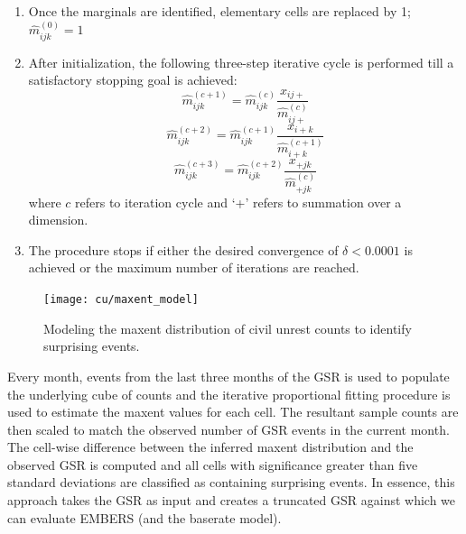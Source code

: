 \begin{enumerate}
\item Once the marginals are identified, elementary cells are replaced by 1; $\widehat{m}^{(0)}_{ijk}=1$
\item After initialization, the following three-step iterative cycle is performed till a satisfactory stopping goal is achieved:
$$\widehat{m}^{(c+1)}_{ijk} = \widehat{m}^{(c)}_{ijk}\frac{x_{ij+}}{\widehat{m}^{(c)}_{ij+}}$$
$$\widehat{m}^{(c+2)}_{ijk} = \widehat{m}^{(c+1)}_{ijk}\frac{x_{i+k}}{\widehat{m}^{(c+1)}_{i+k}}$$
$$\widehat{m}^{(c+3)}_{ijk} = \widehat{m}^{(c+2)}_{ijk}\frac{x_{+jk}}{\widehat{m}^{(c)}_{+jk}}$$
where $c$ refers to iteration cycle and `+' refers to summation over a dimension.
\item The procedure stops if either the desired convergence of $\delta < 0.0001$ is achieved or the maximum number of iterations are reached.
\end{enumerate}


\begin{figure}[H]
\centering
\texttt{[image: cu/maxent\_model]}
\caption{Modeling the maxent distribution of civil unrest counts to identify surprising events.}
\label{fig:maxent_model}
\end{figure}

Every month, events from the last three months of the
GSR is used to populate the underlying cube of counts and the iterative proportional fitting procedure is
used to estimate the maxent values for each cell. The resultant sample counts are then scaled to
match the observed number of GSR events in the current month. The cell-wise difference between the inferred
maxent distribution and the observed GSR is computed and all cells with significance greater than five standard
deviations are classified as containing surprising events. In essence, this approach takes the GSR as input and
creates a truncated GSR against which we can evaluate EMBERS (and the baserate model).

